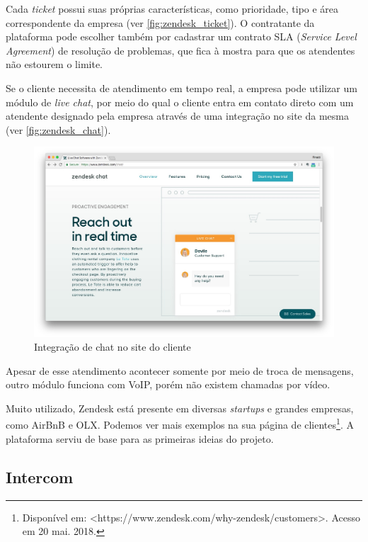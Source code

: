 Cada \textit{ticket} possui suas próprias características, como prioridade, tipo e área correspondente da empresa (ver \autoref{fig:zendesk_ticket}). O contratante da plataforma pode escolher também por cadastrar um contrato SLA (\textit{Service Level Agreement}) de resolução de problemas, que fica à mostra para que os atendentes não estourem o limite.

Se o cliente necessita de atendimento em tempo real, a empresa pode utilizar um módulo de \textit{live chat}, por meio do qual o cliente entra em contato direto com um atendente designado pela empresa através de uma integração no site da mesma (ver \autoref{fig:zendesk_chat}).

\begin{figure}[ht!]
	\centering
		\includegraphics[scale=0.2]{figures/zendesk-chat.jpg} 
	\caption{Integração de chat no site do cliente}
	\label{fig:zendesk_chat}
\end{figure}

Apesar de esse atendimento acontecer somente por meio de troca de mensagens, outro módulo funciona com VoIP, porém não existem chamadas por vídeo.

Muito utilizado, Zendesk está presente em diversas \textit{startups} e grandes empresas, como AirBnB e OLX. Podemos ver mais exemplos na sua página de clientes\footnote{Disponível em: <https://www.zendesk.com/why-zendesk/customers>. Acesso em 20 mai. 2018.}.  A plataforma serviu de base para as primeiras ideias do projeto.

\subsection{Intercom}

